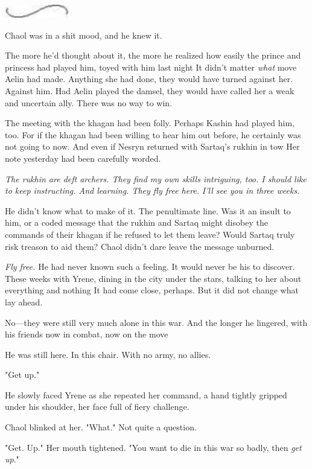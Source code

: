 \includegraphics[width=1.12in,height=0.24in]{images/seperator}

Chaol was in a shit mood, and he knew it.

The more he'd thought about it, the more he realized how easily the prince and princess had played him, toyed with him last night 
It didn't matter \emph{what} move Aelin had made. Anything she had done, they would have turned against her. Against him. Had Aelin played the damsel, they would have called her a weak and uncertain ally. There was no way to win.

The meeting with the khagan had been folly. Perhaps Kashin had played him, too. For if the khagan had been willing to hear him out before, he certainly was not going to now. And even if Nesryn returned with Sartaq's rukhin in tow  Her note yesterday had been carefully worded.

\emph{The rukhin are deft archers. They find my own skills intriguing, too. I should like to keep instructing. And learning. They fly free here.} \emph{I'll see you in three weeks.}

He didn't know what to make of it. The penultimate line. Was it an insult to him, or a coded message that the rukhin and Sartaq might disobey the commands of their khagan if he refused to let them leave? Would Sartaq truly risk treason to aid them? Chaol didn't dare leave the message unburned.

\emph{Fly free.} He had never known such a feeling. It would never be his to discover. These weeks with Yrene, dining in the city under the stars, talking to her about everything and nothing  It had come close, perhaps. But it did not change what lay ahead.

No---they were still very much alone in this war. And the longer he lingered, with his friends now in combat, now on the move 

He was still here. In this chair. With no army, no allies.

"Get up."

He slowly faced Yrene as she repeated her command, a hand tightly gripped under his shoulder, her face full of fiery challenge.

Chaol blinked at her. "What." Not quite a question.

"Get. Up." Her mouth tightened. "You want to die in this war so badly, then \emph{get up}."

